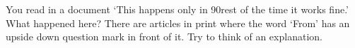 You read in a document `This happens only in 90rest of the time
  it works fine.' What happened here? There are articles in print
  where the word `From' has an upside down question mark in front of
  it. Try to think of an explanation.
